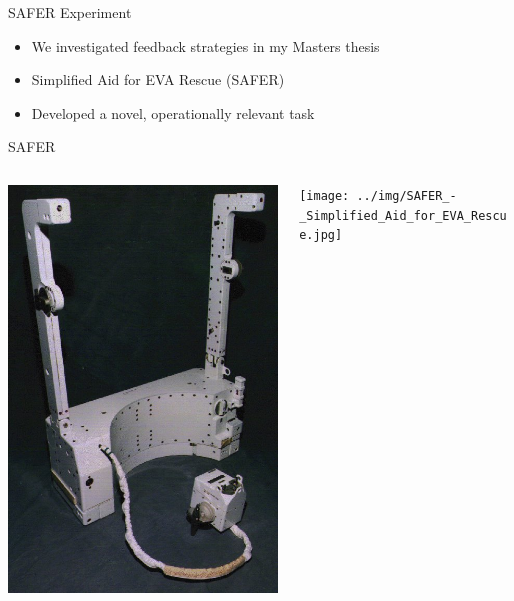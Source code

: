 \documentclass[10pt]{beamer}
\begin{document}
\begin{frame}[fragile]{SAFER Experiment}
  \begin{itemize}
    \setlength\itemsep{1em}
    \item We investigated feedback strategies in my Masters thesis
    \item Simplified Aid for EVA Rescue (SAFER)
    \item Developed a novel, operationally relevant task
  \end{itemize}
\end{frame}

\begin{frame}[fragile]{SAFER}
  \begin{columns}[T]
    \begin{column}{.5\textwidth}
      \hfill
      \includegraphics[height=1.3\textwidth]{../img/SAFER_-_Simplified_Aid_for_EVA_Rescue_2.jpg}
    \end{column}%
    \begin{column}{.5\textwidth}
      \texttt{[image: ../img/SAFER\_-\_Simplified\_Aid\_for\_EVA\_Rescue.jpg]}
    \end{column}
  \end{columns}
\end{frame}
\end{document}
